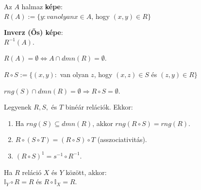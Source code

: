 \begin{frame}
\begin{tcolorbox}[title={Def.: Az $A$ halmaz képe, (ős)képe / inverz képe}]
Az $A$ halmaz \textbf{képe}:\\
$R(A) := \{ y : van olyan x \in A$, hogy $(x, y) \in R \}$\\
\mmedskip

\textbf{Inverz (Ős) képe}:\\
$R^{-1}(A)$.
\end{tcolorbox}

\begin{tcolorbox}[title={Ész}]
$R(A) = \emptyset \iff A \cap dmn(R) = \emptyset$.
\end{tcolorbox}

\begin{tcolorbox}[title={Def.: Az $S$ és $R$ binér relációk kompozíciója}]
$R \circ S := \{ (x, y) : $ van olyan $z$, hogy $(x, z) \in S$ és $(z, y) \in R \}$
\end{tcolorbox}

\begin{tcolorbox}[title={Ész}]
$rng(S) \cap dmn(R) = \emptyset \Rightarrow R \circ S = \emptyset$.
\end{tcolorbox}

\begin{tcolorbox}[title={Def.: Kompozíció tulajdonságai}]
Legyenek $R, S,$ és $T$ binéár relációk. Ekkor:\\
\begin{enumerate}
\item Ha $rng(S) \subseteq dmn(R)$, akkor $rng(R \circ S) = rng(R)$.
\item $R \circ (S \circ T) = (R \circ S) \circ T$ (asszociativitás).
\item $(R \circ S)^{1} = s^{-1} \circ R^{-1}$.
\end{enumerate}

Ha $R$ reláció $X$ és $Y$ között, akkor:\\
$\mathbb{I}_Y \circ R = R$ és $R \circ \mathbb{I}_X = R$.
\end{tcolorbox}
\end{frame}

